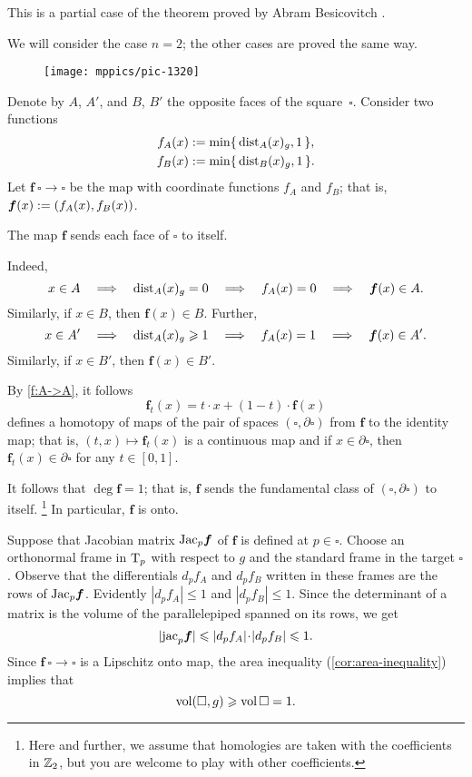 This is a partial case of the theorem proved by Abram Besicovitch \cite{besicovitch}.

We will consider the case $n=2$; the other cases are proved the same way.

\begin{wrapfigure}{r}{30mm}
\vskip-0mm
\centering
\texttt{[image: mppics/pic-1320]}
\end{wrapfigure}

Denote by $A$, $A'$, and $B$, $B'$ the opposite faces of the square~$\square$.
Consider two functions
\begin{align*}
f_A(x)&\mathrel{:=}\min\{\,\mathrm{dist}_A(x)_g,1\,\},
\\
f_B(x)&\mathrel{:=}\min\{\,\mathrm{dist}_B(x)_g,1\,\}.
\end{align*}
Let $\bm{f}\:\square\to\square$ be the map with coordinate functions $f_A$ and $f_B$;
that is, $\bm{f}(x)\mathrel{:=}(f_A(x), f_B(x))$.

\begin{clm}{}\label{f:A->A}
The map $\bm{f}$ sends each face of $\square$ to itself.
\end{clm}


Indeed, 
\[x\in A \quad\Longrightarrow\quad \mathrm{dist}_A(x)_g=0 \quad\Longrightarrow\quad f_A(x)=0 \quad\Longrightarrow\quad \bm{f}(x)\in A.\]
Similarly, if $x\in B$, then $\bm{f}(x)\in B$.
Further, 
\[x\in A'
\quad\Longrightarrow\quad 
\mathrm{dist}_A(x)_g\geqslant 1 
\quad\Longrightarrow\quad 
f_A(x)=1 
\quad\Longrightarrow\quad 
\bm{f}(x)\in A'.\]
Similarly, if $x\in B'$, then $\bm{f}(x)\in B'$.

By \ref{f:A->A}, it follows 
\[\bm{f}_t(x)= t\cdot x + (1-t)\cdot \bm{f}(x)\]
defines a homotopy of maps of the pair of spaces $(\square,\partial \square)$ from $\bm{f}$ to the identity map;
that is, $(t,x)\mapsto \bm{f}_t(x)$ is a continuous map and if $x\in \partial \square$, then $\bm{f}_t(x)\in \partial \square$ for any $t\in [0,1]$.

It follows that $\deg\bm{f}=1$; that is, $\bm{f}$ sends the fundamental class of $(\square,\partial \square)$ to itself.%
\footnote{Here and further, we assume that homologies are taken with the coefficients in $\mathbb{Z}_2$, but you are welcome to play with other coefficients.}
In particular, $\bm{f}$ is onto.

Suppose that Jacobian  matrix $\mathrm{Jac}_p\bm{f}$ of $\bm{f}$ is defined at $p\in \square$.
Choose an orthonormal frame in $\mathrm{T}_p$ with respect to $g$ and the standard frame in the target $\square$.
Observe that the differentials $d_pf_A$ and $d_pf_B$ written in these frames are the rows of $\mathrm{Jac}_p\bm{f}$.
Evidently $|d_pf_A|\le 1$ and $|d_pf_B|\le 1$.
Since the determinant of a matrix is the volume of the parallelepiped spanned on its rows, we get 
\[|\jac_p \bm{f}|\le |d_pf_A|\cdot|d_pf_B|\le 1.\]
Since $\bm{f}\:\square\to\square$ is a Lipschitz onto map, the area inequality (\ref{cor:area-inequality}) implies that 
\[\operatorname{\rm vol}\nolimits(\square,g)\geqslant \operatorname{\rm vol}\nolimits\square=1.\]
\qedsf

